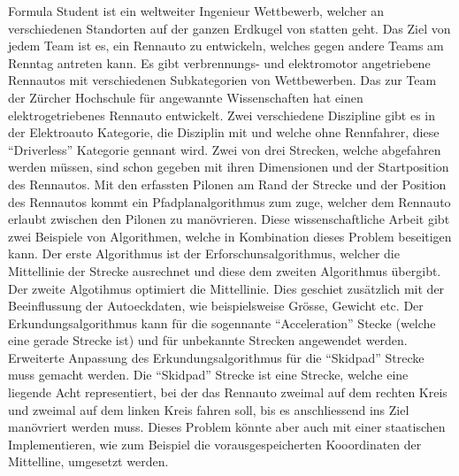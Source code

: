 Formula Student ist ein weltweiter Ingenieur Wettbewerb, welcher an verschiedenen Standorten auf der ganzen Erdkugel von statten geht. Das Ziel von jedem Team ist es, ein Rennauto zu entwickeln, welches gegen andere Teams am Renntag antreten kann. Es gibt verbrennungs- und elektromotor angetriebene Rennautos mit verschiedenen Subkategorien von Wettbewerben. Das \acrlong{zur} Team der Zürcher Hochschule für angewannte Wissenschaften hat einen elektrogetriebenes Rennauto entwickelt. Zwei verschiedene Diszipline gibt es in der Elektroauto Kategorie, die Disziplin mit und welche ohne Rennfahrer, diese ``Driverless'' Kategorie gennant wird. Zwei von drei Strecken, welche abgefahren werden müssen, sind schon gegeben mit ihren Dimensionen und der Startposition des Rennautos. Mit den erfassten Pilonen am Rand der Strecke und der Position des Rennautos kommt ein Pfadplanalgorithmus zum zuge, welcher dem Rennauto erlaubt zwischen den Pilonen zu manövrieren. Diese wissenschaftliche Arbeit gibt zwei Beispiele von Algorithmen, welche in Kombination dieses Problem beseitigen kann. Der erste Algorithmus ist der Erforschunsalgorithmus, welcher die Mittellinie der Strecke ausrechnet und diese dem zweiten Algorithmus übergibt. Der zweite Algotihmus optimiert die Mittellinie. Dies geschiet zusätzlich mit der Beeinflussung der Autoeckdaten, wie beispielsweise Grösse, Gewicht etc. Der Erkundungsalgorithmus kann für die sogennante ``Acceleration'' Stecke (welche eine gerade Strecke ist) und für unbekannte Strecken angewendet werden. Erweiterte Anpassung des Erkundungsalgorithmus für die ``Skidpad'' Strecke muss gemacht werden. Die ``Skidpad'' Strecke ist eine Strecke, welche eine liegende Acht representiert, bei der das Rennauto zweimal auf dem rechten Kreis und zweimal auf dem linken Kreis fahren soll, bis es anschliessend ins Ziel manövriert werden muss. Dieses Problem könnte aber auch mit einer staatischen Implementieren, wie zum Beispiel die vorausgespeicherten Kooordinaten der Mittelline, umgesetzt werden.